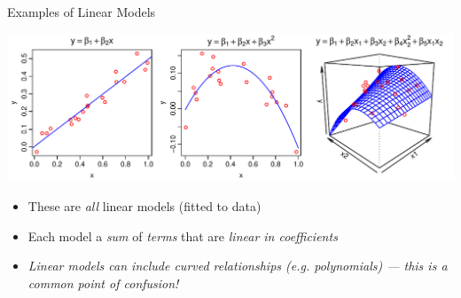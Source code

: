 \documentclass[xcolor=x11names,compress]{beamer}
\renewcommand{\(}{\begin{columns}}
\renewcommand{\)}{\end{columns}}
\newcommand{\<}[1]{\begin{column}{#1}}
\renewcommand{\>}{\end{column}}
\begin{document}

\begin{frame}{Examples of Linear Models}

    \includegraphics[width=\textwidth]{Linear.pdf}
    
    \begin{itemize}\itemsep10pt
    \item These are {\it all} linear models (fitted to data)
    \item Each model a {\it sum} of {\it terms} that are {\it linear in coefficients}
    \item {\it Linear models can include curved relationships (e.g. polynomials) --- this is a common point of confusion!}
    \end{itemize}
    
    \end{frame}
    
\end{document}
